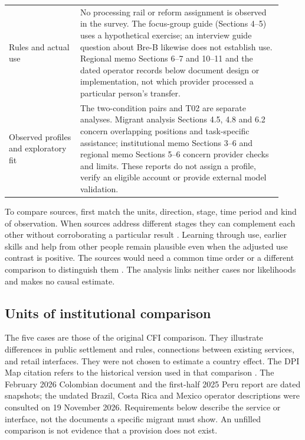 {\begin{singlespace}
\begin{longtable}{@{}
  >{\raggedright\arraybackslash}p{0.24\linewidth}
  >{\raggedright\arraybackslash}p{0.68\linewidth}@{}}
Rules and actual use & No processing rail or reform assignment is observed in the survey. The focus-group guide (Sections 4--5) uses a hypothetical exercise; an interview guide question about Bre-B likewise does not establish use. Regional memo Sections 6--7 and 10--11 and the dated operator records below document design or implementation, not which provider processed a particular person's transfer. \\
Observed profiles and exploratory fit & The two-condition pairs and T02 are separate analyses. Migrant analysis Sections 4.5, 4.8 and 6.2 concern overlapping positions and task-specific assistance; institutional memo Sections 3--6 and regional memo Sections 5--6 concern provider checks and limits. These reports do not assign a profile, verify an eligible account or provide external model validation. \\
\end{longtable}
\end{singlespace}}

To compare sources, first match the units, direction, stage, time period and kind of observation. When sources address different stages they can complement each other without corroborating a particular result \citep{ocathainMurphyNicholl2010,guettermanFettersCreswell2015}. Learning through use, earlier skills and help from other people remain plausible even when the adjusted use contrast is positive. The sources would need a common time order or a different comparison to distinguish them \citep{humphreysJacobs2023}. The analysis links neither cases nor likelihoods and makes no causal estimate.

\subsection{Units of institutional comparison}
The five cases are those of the original CFI comparison. They illustrate differences in public settlement and rules, connections between existing services, and retail interfaces. They were not chosen to estimate a country effect. The DPI Map citation refers to the historical version used in that comparison \citep{institute_for_innovation_and_public_purpose_ucl_dpi_2025}. The February 2026 Colombian document and the first-half 2025 Peru report are dated snapshots; the undated Brazil, Costa Rica and Mexico operator descriptions were consulted on 19 November 2026. Requirements below describe the service or interface, not the documents a specific migrant must show. An unfilled comparison is not evidence that a provision does not exist.

